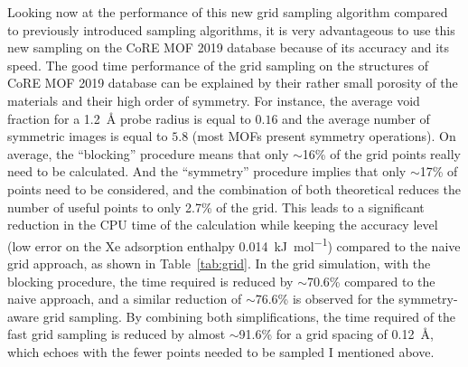 \documentclass[main]{subfiles}
\begin{document}
Looking now at the performance of this new grid sampling algorithm compared to previously introduced sampling algorithms, it is very advantageous to use this new sampling on the CoRE MOF 2019 database because of its accuracy and its speed.
The good time performance of the grid sampling on the structures of CoRE MOF 2019 database can be explained by their rather small porosity of the materials and their high order of symmetry. For instance, the average void fraction for a \SI{1.2}{\angstrom} probe radius is equal to $0.16$ and the average number of symmetric images is equal to $5.8$ (most MOFs present symmetry operations). On average, the ``blocking'' procedure means that only {$\sim$16\%} of the grid points really need to be calculated. And the ``symmetry'' procedure implies that only {$\sim$17\%} of points need to be considered, and the combination of both theoretical reduces the number of useful points to only {2.7\%} of the grid. This leads to a significant reduction in the CPU time of the calculation while keeping the accuracy level (low error on the Xe adsorption enthalpy \SI{0.014}{\kilo\joule\per\mole}) compared to the naive grid approach, as shown in Table~\ref{tab:grid}. In the grid simulation, with the blocking procedure, the time required is reduced by {$\sim$70.6\%} compared to the naive approach, and a similar reduction of {$\sim$76.6\%} is observed for the symmetry-aware grid sampling. By combining both simplifications, the time required of the fast grid sampling is reduced by almost {$\sim$91.6\%} for a grid spacing of \SI{0.12}{\angstrom}, which echoes with the fewer points needed to be sampled I mentioned above.
\end{document}
